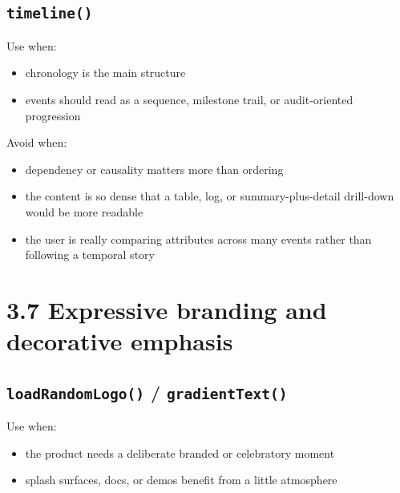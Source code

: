 \subsection{\texorpdfstring{\texttt{t\allowbreak{}i\allowbreak{}m\allowbreak{}e\allowbreak{}l\allowbreak{}i\allowbreak{}n\allowbreak{}e\allowbreak{}(\allowbreak{})}}{}}\label{record-023-timeline}

Use when:

\begin{itemize}
\tightlist
\item
  chronology is the main structure
\item
  events should read as a sequence, milestone trail, or audit-oriented progression
\end{itemize}

Avoid when:

\begin{itemize}
\tightlist
\item
  dependency or causality matters more than ordering
\item
  the content is so dense that a table, log, or summary-plus-detail drill-down would be more readable
\item
  the user is really comparing attributes across many events rather than following a temporal story
\end{itemize}

\section{3.7 Expressive branding and decorative emphasis}\label{record-023-expressive-branding-and-decorative-emphasis}

\subsection{\texorpdfstring{\texttt{l\allowbreak{}o\allowbreak{}a\allowbreak{}d\allowbreak{}R\allowbreak{}a\allowbreak{}n\allowbreak{}d\allowbreak{}o\allowbreak{}m\allowbreak{}L\allowbreak{}o\allowbreak{}g\allowbreak{}o\allowbreak{}(\allowbreak{})} / \texttt{g\allowbreak{}r\allowbreak{}a\allowbreak{}d\allowbreak{}i\allowbreak{}e\allowbreak{}n\allowbreak{}t\allowbreak{}T\allowbreak{}e\allowbreak{}x\allowbreak{}t\allowbreak{}(\allowbreak{})}}{ / }}\label{record-023-loadrandomlogo-gradienttext}

Use when:

\begin{itemize}
\tightlist
\item
  the product needs a deliberate branded or celebratory moment
\item
  splash surfaces, docs, or demos benefit from a little atmosphere
\end{itemize}

